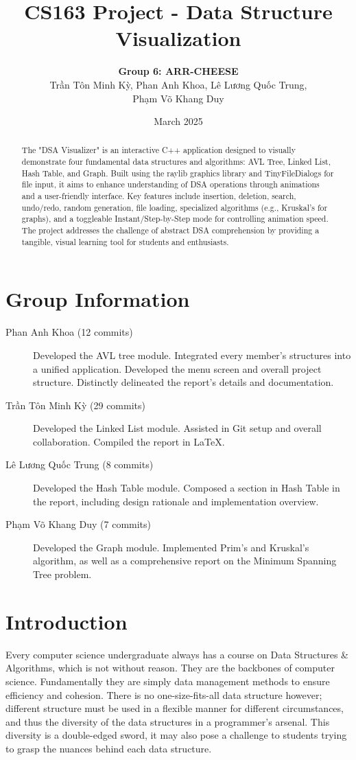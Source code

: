 \documentclass{article}
\title{CS163 Project - Data Structure Visualization}
\author{\textbf{Group 6: ARR-CHEESE}\\\foreignlanguage{vietnamese}{Trần Tôn Minh Kỳ, Phan Anh Khoa, Lê Lương Quốc Trung,}\\\foreignlanguage{vietnamese}{Phạm Võ Khang Duy}}
\date{March 2025}
\begin{document}
\maketitle

\begin{abstract}
    The "DSA Visualizer" is an interactive C++ application designed to visually demonstrate four fundamental data structures and algorithms: AVL Tree, Linked List, Hash Table, and Graph. Built using the raylib graphics library and TinyFileDialogs for file input, it aims to enhance understanding of DSA operations through animations and a user-friendly interface. Key features include insertion, deletion, search, undo/redo, random generation, file loading, specialized algorithms (e.g., Kruskal's for graphs), and a toggleable Instant/Step-by-Step mode for controlling animation speed. The project addresses the challenge of abstract DSA comprehension by providing a tangible, visual learning tool for students and enthusiasts.
\end{abstract}

\tableofcontents

\newpage
\section{Group Information}
\begin{description}
	\item[\foreignlanguage{vietnamese}{Phan Anh Khoa (12 commits)}] Developed the AVL tree module. Integrated every member's structures into a unified application. Developed the menu screen and overall project structure. Distinctly delineated the report's details and documentation.
	\item[\foreignlanguage{vietnamese}{Trần Tôn Minh Kỳ (29 commits)}] Developed the Linked List module. Assisted in Git setup and overall collaboration. Compiled the report in \LaTeX.
	\item[\foreignlanguage{vietnamese}{Lê Lương Quốc Trung (8 commits)}] Developed the Hash Table module. Composed a section in Hash Table in the report, including design rationale and implementation overview.
	\item[\foreignlanguage{vietnamese}{Phạm Võ Khang Duy (7 commits)}] Developed the Graph module. Implemented Prim's and Kruskal's algorithm, as well as a comprehensive report on the Minimum Spanning Tree problem.  
\end{description}

\section{Introduction}
Every computer science undergraduate always has a course on Data Structures \& Algorithms, which is not without reason. They are the backbones of computer science. Fundamentally they are simply data management methods to ensure efficiency and cohesion. There is no one-size-fits-all data structure however; different structure must be used in a flexible manner for different circumstances, and thus the diversity of the data structures in a programmer's arsenal. This diversity is a double-edged sword, it may also pose a challenge to students trying to grasp the nuances behind each data structure.
\end{document}
